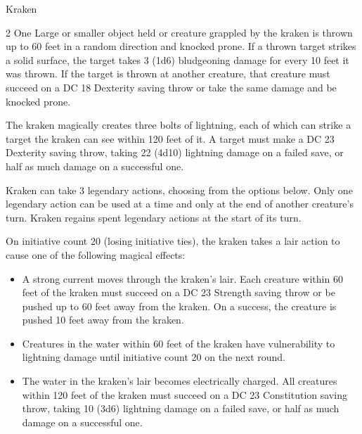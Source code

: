 \documentclass[10pt,a4paper,twoside,bg=print,twocolumn,openany,nodeprecatedcode]{dndbook}
\begin{document}
\begin{DndMonster}[float*=b,width=\textwidth + 8pt]{Kraken}
\begin{multicols}{2}
One Large or smaller object held or creature grappled by the kraken is thrown up to 60 feet in a random direction and knocked prone. If a thrown target strikes a solid surface, the target takes 3 (1d6) bludgeoning damage for every 10 feet it was thrown. If the target is thrown at another creature, that creature must succeed on a DC 18 Dexterity saving throw or take the same damage and be knocked prone.

The kraken magically creates three bolts of lightning, each of which can strike a target the kraken can see within 120 feet of it. A target must make a DC 23 Dexterity saving throw, taking 22 (4d10) lightning damage on a failed save, or half as much damage on a successful one.

Kraken can take 3 legendary actions, choosing from the options below. Only one legendary action can be used at a time and only at the end of another creature's turn. Kraken regains spent legendary actions at the start of its turn.

\begin{DndMonsterLegendaryActions}
\end{DndMonsterLegendaryActions}
On initiative count 20 (losing initiative ties), the kraken takes a lair action to cause one of the following magical effects:


\begin{itemize}
\item A strong current moves through the kraken's lair. Each creature within 60 feet of the kraken must succeed on a DC 23 Strength saving throw or be pushed up to 60 feet away from the kraken. On a success, the creature is pushed 10 feet away from the kraken.
\item Creatures in the water within 60 feet of the kraken have vulnerability to lightning damage until initiative count 20 on the next round.
\item The water in the kraken's lair becomes electrically charged. All creatures within 120 feet of the kraken must succeed on a DC 23 Constitution saving throw, taking 10 (3d6) lightning damage on a failed save, or half as much damage on a successful one.
\end{itemize}


\end{multicols}
\end{DndMonster}
\end{document}
